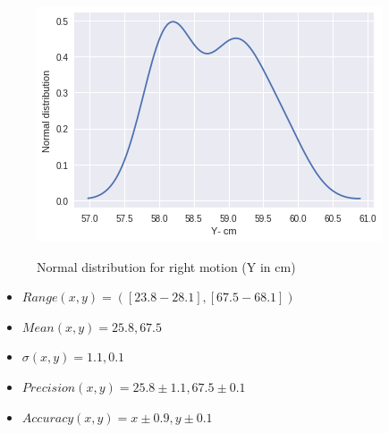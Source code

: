 \documentclass[11pt,a4paper]{article}
\begin{document}
\begin{itemize}
		\begin{figure}[H]
			\centering	
			\includegraphics[width=0.8\linewidth]{old_rightmotion_kdeplot_Y}
			\label{fig:straightG}
			\caption{Normal distribution for right motion (Y in cm)}
		\end{figure}
		\begin{itemize}
			\item $ Range (x,y) =([23.8-28.1],[67.5-68.1]) $
			\item $ Mean (x, y) = 25.8,67.5$
			\item $ \sigma (x, y)= 1.1, 0.1 $
			\item $ Precision (x, y)= 25.8 \pm 1.1, 67.5 \pm 0.1  $
			\item $ Accuracy (x,y) = x \pm0.9  , y \pm0.1 $  
		\end{itemize}
		

\end{itemize}
\end{document}
